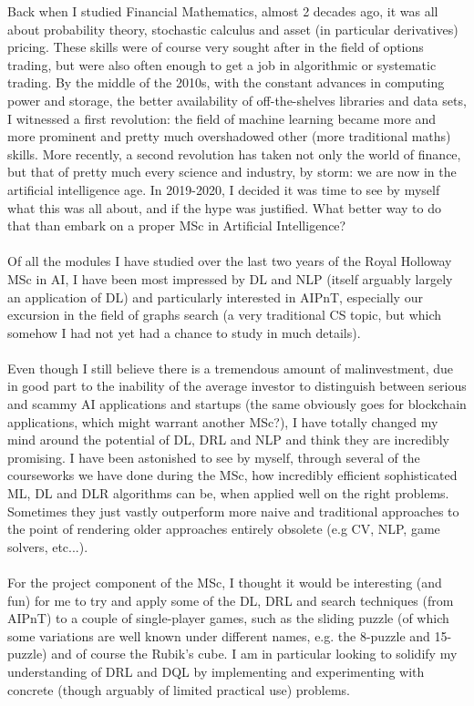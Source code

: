 Back when I studied Financial Mathematics, almost 2 decades ago, it was all about probability theory, stochastic calculus and asset (in particular derivatives) pricing. These skills were of course very sought after in the field of options trading, but were also often enough to get a job in algorithmic or systematic trading. By the middle of the 2010s, with the constant advances in computing power and storage, the better availability of off-the-shelves libraries and data sets, I witnessed a first revolution: the field of machine learning became more and more prominent and pretty much overshadowed other (more traditional maths) skills. More recently, a  second revolution has taken not only the world of finance, but that of pretty much every science and industry, by storm: we are now in the artificial intelligence age.
In 2019-2020, I decided it was time to see by myself what this was all about, and if the hype was justified. What better way to do that than embark on a proper MSc in Artificial Intelligence?
\\
\\
Of all the modules I have studied over the last two years of the Royal Holloway MSc in AI, I have been most impressed by DL and  NLP (itself arguably largely an application of DL) and particularly interested in AIPnT, especially our excursion in the field of graphs search (a very traditional CS topic, but which somehow I had not yet had a chance to study in much details).
\\
\\
Even though I still believe there is a tremendous amount of malinvestment, due in good part to the inability of the average investor to distinguish between serious and scammy AI applications and startups (the same obviously goes for blockchain applications, which might warrant another MSc?), I have totally changed my mind around the potential of DL, DRL and NLP and think they are incredibly promising. I have been astonished to see by myself, through several of the courseworks we have done during the MSc, how incredibly efficient sophisticated ML, DL and DLR algorithms can be, when applied well on the right problems. Sometimes they just vastly outperform more naive and traditional approaches to the point of rendering older approaches entirely obsolete (e.g CV, NLP, game solvers, etc...).
\\
\\
For the project component of the MSc, I thought it would be interesting (and fun) for me to try and apply some of the DL, DRL and search techniques (from AIPnT) to a couple of single-player games, such as the sliding puzzle (of which some variations are well known under different names, e.g. the 8-puzzle and 15-puzzle) and of course the Rubik's cube. I am in particular looking to solidify my understanding of DRL and DQL by  implementing and experimenting with concrete (though arguably of limited practical use) problems.

